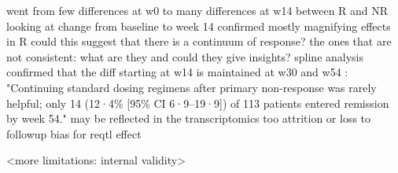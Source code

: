 \begin{outline}
\1 went from few differences at w0 to many differences at w14 between R and NR
    \2 looking at change from baseline to week 14 confirmed mostly magnifying effects in R
        \3 could this suggest that there is a continuum of response?
    \2 the ones that are not consistent: what are they and could they give insights?
    \2 spline analysis confirmed that the diff starting at w14 is maintained at w30 and w54
    \2 \autocite{kennedy2019PredictorsAntiTNFTreatment}: "Continuing standard dosing regimens after primary non-response was rarely helpful; only 14 (12·4\% [95\% CI 6·9–19·9]) of 113 patients entered remission by week 54."
        \3 may be reflected in the transcriptomics too
    \2 attrition or loss to followup bias for reqtl effect




\1 <more limitations: internal validity>


\end{outline}
